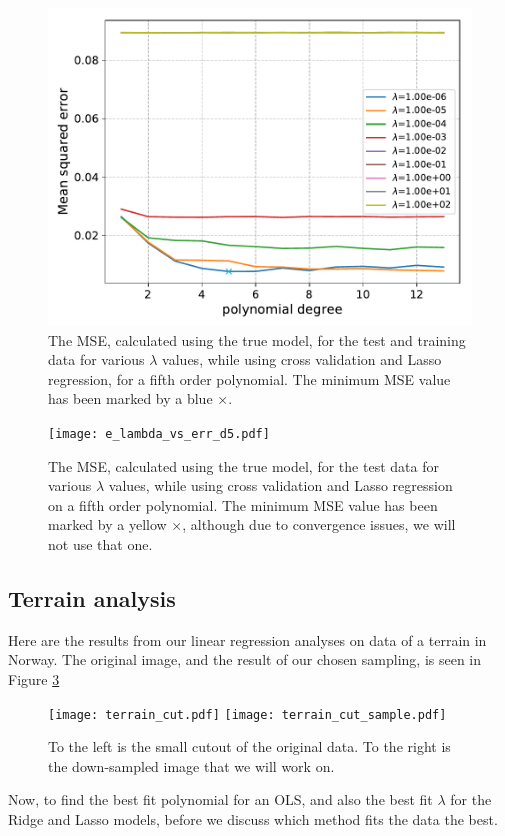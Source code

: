 \documentclass[a4paper,10pt,english]{article}
\begin{document}
\begin{figure}[H]
	\centering
	\includegraphics[scale=0.6]{e_Lasso_MSE_pdegree_lmbda.pdf}
	\caption{The MSE, calculated using the true model, for the test and training data for various $\lambda$ values, while using cross validation and Lasso regression, for a fifth order polynomial. The minimum MSE value has been marked by a blue $\times$.}
	\label{fig:7}
\end{figure}

\begin{figure}[H]
	\centering
	\texttt{[image: e\_lambda\_vs\_err\_d5.pdf]}
	\caption{The MSE, calculated using the true model, for the test data for various $\lambda$ values, while using cross validation and Lasso regression on a fifth order polynomial. The minimum MSE value has been marked by a yellow $\times$, although due to convergence issues, we will not use that one.}
	\label{fig:8}
\end{figure}


\subsection{Terrain analysis}
Here are the results from our linear regression analyses on data of a terrain in Norway. The original image, and the result of our chosen sampling, is seen in Figure \ref{fig:terrain}
\begin{figure}[H]
	\centering
	\texttt{[image: terrain\_cut.pdf]}\hspace{-5em}
	\texttt{[image: terrain\_cut\_sample.pdf]}
	\caption{To the left is the small cutout of the original data. To the right is the down-sampled image that we will work on.}
	\label{fig:terrain}
\end{figure}
Now, to find the best fit polynomial for an OLS, and also the best fit $\lambda$ for the Ridge and Lasso models, before we discuss which method fits the data the best.
\end{document}
